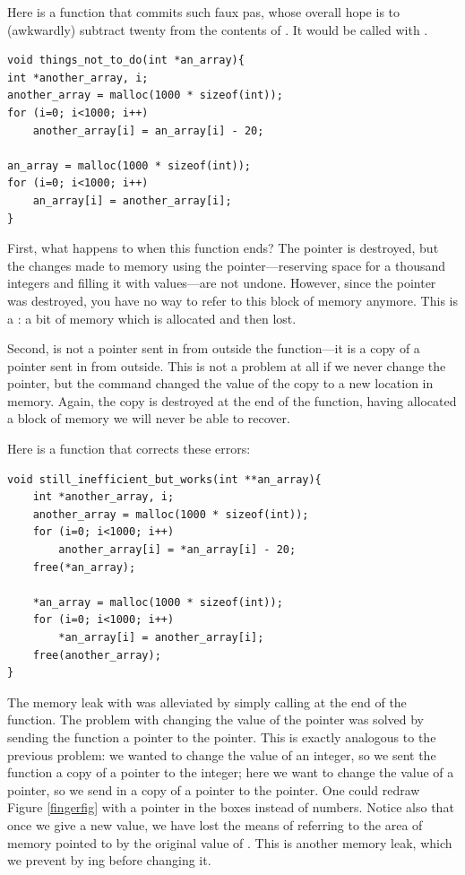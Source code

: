 \documentclass[12pt]{article}
\begin{document}
Here is a function that commits such faux pas,
whose overall hope is to (awkwardly) subtract twenty from
the contents of . It would be called with
.  
\begin{lstlisting}
void things_not_to_do(int *an_array){
int *another_array, i;
another_array = malloc(1000 * sizeof(int));
for (i=0; i<1000; i++)
    another_array[i] = an_array[i] - 20;

an_array = malloc(1000 * sizeof(int));
for (i=0; i<1000; i++)
    an_array[i] = another_array[i];
}
\end{lstlisting}

First, what happens to  when this function
ends? The pointer is destroyed, but the changes made to memory using
the pointer---reserving space for a thousand integers and filling it
with values---are not undone. However, since the pointer was destroyed,
you have no way to refer to this block of memory anymore.  This is a
: a bit of memory which is allocated and then lost.

Second,  is not a pointer sent in from outside the
function---it is a copy of a pointer sent in from outside. This is not
a problem at all if we never change the pointer, but the command
 changed the value of the copy
 to a new location in memory.  Again, the copy is
destroyed at the end of the function, having allocated a block of memory
we will never be able to recover.

Here is a function that corrects these errors:

\begin{lstlisting}
void still_inefficient_but_works(int **an_array){
    int *another_array, i;
    another_array = malloc(1000 * sizeof(int));
    for (i=0; i<1000; i++)
        another_array[i] = *an_array[i] - 20;
    free(*an_array);

    *an_array = malloc(1000 * sizeof(int));
    for (i=0; i<1000; i++)
        *an_array[i] = another_array[i];
    free(another_array);
}
\end{lstlisting}

The memory leak with  was alleviated by simply
calling  at the end of the function. The problem with
changing the value of the pointer was solved by sending the function a
pointer to the pointer. This is exactly analogous to the previous problem:
we wanted to change the value of an integer, so we sent the function a
copy of a pointer to the integer; here we want to change the value of a
pointer, so we send in a copy of a pointer to the pointer. One could
redraw Figure \ref{fingerfig} with a pointer in the boxes instead of
numbers. Notice also
that once we give  a new value, we have lost the
means of referring to the area of memory pointed to by the original
value of . This is another memory leak, which we
prevent by ing  before changing it.
\end{document}

